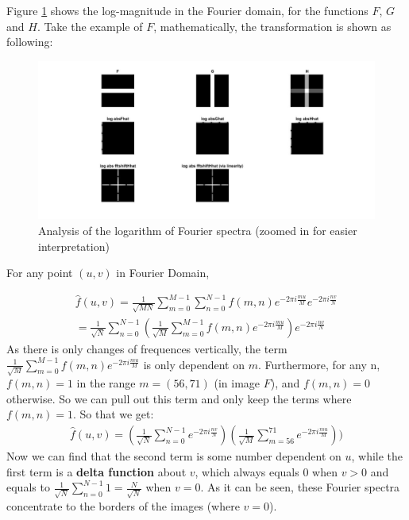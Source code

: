 \documentclass{article}
\begin{document}
\begin{enumerate}
Figure \ref{fig1.4} shows the log-magnitude in the Fourier domain, for the functions $F$, $G$ and $H$.
 Take the example of $F$, mathematically, the transformation is shown as following:\\


\begin{figure}[H]
        \centering
        \includegraphics[width=16cm]{14(zoomed2).jpg}
        \caption{Analysis of the logarithm of Fourier spectra (zoomed in for easier interpretation)}
        \label{fig1.4}
\end{figure}

For any point $(u,v)$ in Fourier Domain,

\begin{align*}
    \hat f(u,v) = \frac{1}{\sqrt{MN}} \sum_{m = 0}^{M-1} \sum_{n = 0}^{N-1} f(m,n) e^{-2\pi i \frac{mu}{M}} e^{-2\pi i \frac{nv}{N}}\\
    = \frac{1}{\sqrt{N}} \sum_{n = 0}^{N-1} (\frac{1}{\sqrt{M}} \sum_{m = 0}^{M-1} f(m,n) e^{-2\pi i \frac{mu}{M}}) e^{-2\pi i \frac{nv}{N}}
\end{align*}
As there is only changes of frequences vertically, the term $\frac{1}{\sqrt{M}} \sum_{m = 0}^{M-1} f(m,n) e^{-2\pi i \frac{mu}{M}}$ is only dependent on $m$. Furthermore, for any n, $f(m,n) = 1$ in the range $m = (56,71)$ (in image $F$), and  $f(m,n) = 0$ otherwise.  So we can pull out this term and only keep the terms where $f(m,n) = 1$. So that we get:
\begin{align*}
    \hat f(u,v) = (\frac{1}{\sqrt{N}} \sum_{n = 0}^{N-1} e^{-2\pi i \frac{nv}{N}})
    (\frac{1}{\sqrt{M}} \sum_{m = 56}^{71} e^{-2\pi i \frac{mu}{M}}))
\end{align*}
Now we can find that the second term is some number dependent on $u$, while the first term is a \textbf{delta function} about $v$, which always equals $0$ when $v>0$ and equals to $\frac{1}{\sqrt{N}} \sum_{n = 0}^{N-1} 1 = \frac{N}{\sqrt{N}}$ when $v=0$. %
As it can be seen, these Fourier spectra concentrate to the borders of the images (where $v = 0$).


\end{enumerate}
\end{document}
